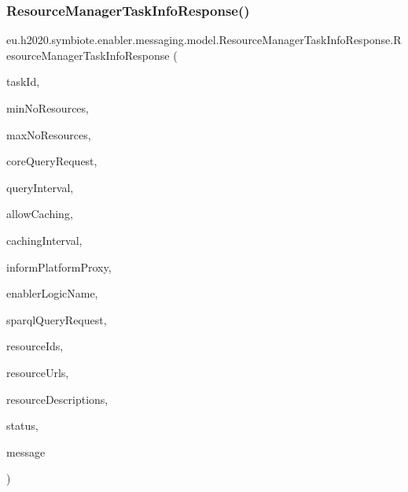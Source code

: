 \subsubsection{\texorpdfstring{Resource\+Manager\+Task\+Info\+Response()}{ResourceManagerTaskInfoResponse()}\hspace{0.1cm}{\footnotesize\ttfamily [2/4]}}
{\footnotesize\ttfamily eu.\+h2020.\+symbiote.\+enabler.\+messaging.\+model.\+Resource\+Manager\+Task\+Info\+Response.\+Resource\+Manager\+Task\+Info\+Response (\begin{DoxyParamCaption}\item[{@Json\+Property(\char`\"{}task\+Id\char`\"{}) String}]{task\+Id,  }\item[{@Json\+Property(\char`\"{}min\+No\+Resources\char`\"{}) Integer}]{min\+No\+Resources,  }\item[{@Json\+Property(\char`\"{}max\+No\+Resources\char`\"{}) Integer}]{max\+No\+Resources,  }\item[{@Json\+Property(\char`\"{}core\+Query\+Request\char`\"{}) Core\+Query\+Request}]{core\+Query\+Request,  }\item[{@Json\+Property(\char`\"{}query\+Interval\char`\"{}) String}]{query\+Interval,  }\item[{@Json\+Property(\char`\"{}allow\+Caching\char`\"{}) Boolean}]{allow\+Caching,  }\item[{@Json\+Property(\char`\"{}caching\+Interval\char`\"{}) String}]{caching\+Interval,  }\item[{@Json\+Property(\char`\"{}inform\+Platform\+Proxy\char`\"{}) Boolean}]{inform\+Platform\+Proxy,  }\item[{@Json\+Property(\char`\"{}enabler\+Logic\+Name\char`\"{}) String}]{enabler\+Logic\+Name,  }\item[{@Json\+Property(\char`\"{}sparql\+Query\+Request\char`\"{}) Sparql\+Query\+Request}]{sparql\+Query\+Request,  }\item[{@Json\+Property(\char`\"{}resource\+Ids\char`\"{}) List$<$ String $>$}]{resource\+Ids,  }\item[{@Json\+Property(\char`\"{}resource\+Urls\char`\"{}) Map$<$ String, String $>$}]{resource\+Urls,  }\item[{@Json\+Property(\char`\"{}resource\+Descriptions\char`\"{}) List$<$ \hyperlink{classeu_1_1h2020_1_1symbiote_1_1core_1_1ci_1_1QueryResourceResult}{Query\+Resource\+Result} $>$}]{resource\+Descriptions,  }\item[{@Json\+Property(\char`\"{}status\char`\"{}) Resource\+Manager\+Task\+Info\+Response\+Status}]{status,  }\item[{@Json\+Property(\char`\"{}message\char`\"{}) String}]{message }\end{DoxyParamCaption})}


